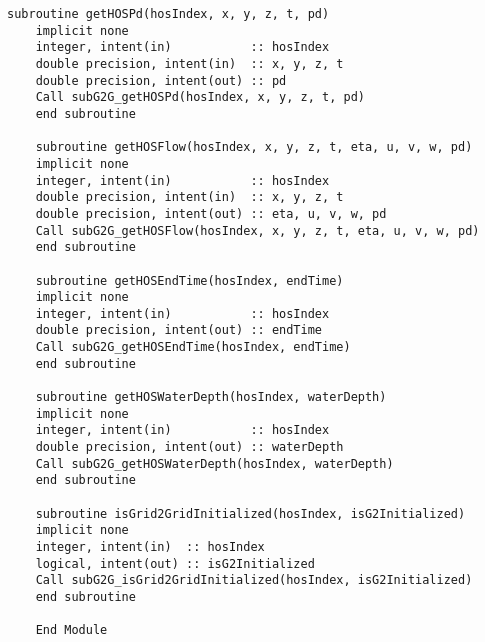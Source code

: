 \begin{lstlisting}[language={[95]Fortran}]
	subroutine getHOSPd(hosIndex, x, y, z, t, pd)
	implicit none
	integer, intent(in)           :: hosIndex
	double precision, intent(in)  :: x, y, z, t
	double precision, intent(out) :: pd
	Call subG2G_getHOSPd(hosIndex, x, y, z, t, pd)
	end subroutine
	
	subroutine getHOSFlow(hosIndex, x, y, z, t, eta, u, v, w, pd)
	implicit none
	integer, intent(in)           :: hosIndex
	double precision, intent(in)  :: x, y, z, t
	double precision, intent(out) :: eta, u, v, w, pd
	Call subG2G_getHOSFlow(hosIndex, x, y, z, t, eta, u, v, w, pd)
	end subroutine
	
	subroutine getHOSEndTime(hosIndex, endTime)
	implicit none
	integer, intent(in)           :: hosIndex
	double precision, intent(out) :: endTime
	Call subG2G_getHOSEndTime(hosIndex, endTime)
	end subroutine
	
	subroutine getHOSWaterDepth(hosIndex, waterDepth)
	implicit none
	integer, intent(in)           :: hosIndex
	double precision, intent(out) :: waterDepth
	Call subG2G_getHOSWaterDepth(hosIndex, waterDepth)
	end subroutine
	
	subroutine isGrid2GridInitialized(hosIndex, isG2Initialized)
	implicit none
	integer, intent(in)  :: hosIndex
	logical, intent(out) :: isG2Initialized
	Call subG2G_isGrid2GridInitialized(hosIndex, isG2Initialized)
	end subroutine
	
	End Module	
	\end{lstlisting}	